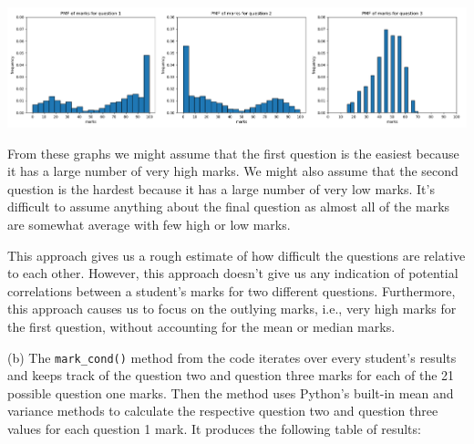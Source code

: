 \documentclass[10pt]{article}
\begin{document}
\begin{center}
    \includegraphics[scale=0.5]{q2_a.png}
\end{center}

From these graphs we might assume that the first question is the easiest because it has a large number of very high marks. We might also assume that the second question is the hardest because it has a large number of very low marks. It's difficult to assume anything about the final question as almost all of the marks are somewhat average with few high or low marks.

This approach gives us a rough estimate of how difficult the questions are relative to each other. However, this approach doesn't give us any indication of potential correlations between a student's marks for two different questions. Furthermore, this approach causes us to focus on the outlying marks, i.e., very high marks for the first question, without accounting for the mean or median marks.

\noindent (b) The \texttt{mark\_cond()} method from the code iterates over every student's results and keeps track of the question two and question three marks for each of the 21 possible question one marks. Then the method uses Python's built-in mean and variance methods to calculate the respective question two and question three values for each question 1 mark. It produces the following table of results:
\end{document}
